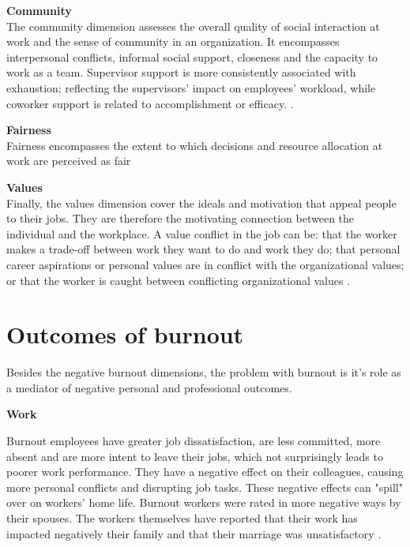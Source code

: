 \textbf{Community}\\
The community dimension assesses the overall quality of social interaction at work and the sense of community in an organization. It encompasses interpersonal conflicts, informal social support, closeness and the capacity to work as a team. Supervisor support is more consistently associated with exhaustion; reflecting the supervisors' impact on employees' workload, while coworker support is related to accomplishment or efficacy.
\parencites{brom_areas_2015}[46]{maslach_understanding_2017}.

\textbf{Fairness}\\
Fairness encompasses the extent to which decisions and resource allocation at work are perceived as fair \parencite{brom_areas_2015}

\textbf{Values}\\
Finally, the values dimension cover the ideals and motivation that appeal people to their jobs. They are therefore the motivating connection between the individual and the workplace. A value conflict in the job can be: that the worker makes a trade-off between work they want to do and work they do; that personal career aspirations or personal values are in conflict with the organizational values; or that the worker is caught between conflicting organizational values \parencites{brom_areas_2015}[47]{maslach_understanding_2017}.

\section{Outcomes of burnout}

Besides the negative burnout dimensions, the problem with burnout is it's role as a mediator of negative personal and professional outcomes.

\textbf{Work}

Burnout employees have greater job dissatisfaction, are less committed, more absent and are more intent to leave their jobs, which not surprisingly leads to poorer work performance. They have a negative effect on their colleagues, causing more personal conflicts and disrupting job tasks. These negative effects can "spill" over on workers' home life. Burnout workers were rated in more negative ways by their spouses. The workers themselves have reported that their work has impacted negatively their family and that their marriage was unsatisfactory \parencite[49]{maslach_understanding_2017}. 

